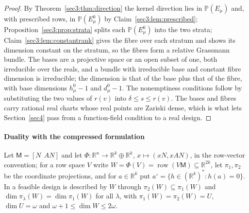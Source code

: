 \documentclass[journal]{IEEEtran}
\theoremstyle{plainn}
\theoremstyle{remark}
\newcommand{\row}{\operatorname{row}}
\begin{document}
\begin{proof}
By Theorem~\ref{sec3:thm:direction} the kernel direction lies in $\mathbb{P}(E_\mu)$ and, with
prescribed rows, in $\mathbb{P}(E_\mu^0)$ by Claim~\ref{sec3:lem:prescribed};
Proposition~\ref{sec3:prop:strata} splits each $\mathbb{P}(E_\mu^0)$ into the two strata;
Claim~\ref{sec3:lem:constantrank} gives the fibre over each stratum and shows its dimension constant on
the stratum, so the fibres form a relative Grassmann bundle. The bases are a projective space or an open
subset of one, both irreducible over the reals, and a bundle with irreducible base and constant fibre
dimension is irreducible; the dimension is that of the base plus that of the fibre, with base
dimensions $h_\mu^0-1$ and $d_\mu^0-1$. The nonemptiness conditions follow by substituting the two
values of $r(v)$ into $\delta\le s\le r(v)$. The bases and fibres carry rational real charts whose real
points are Zariski dense, which is what lets Section~\ref{sec4} pass from a function-field condition to
a real design.
\end{proof}


\paragraph*{Duality with the compressed formulation}\label{sec3:sub:duality}

Let $\mathsf{M}=[N\ \ AN]$ and let $\Phi\colon\mathbb{R}^n\to\mathbb{R}^{k}\oplus\mathbb{R}^{k}$,
$x\mapsto(xN,xAN)$, in the row-vector convention; for a row space $V$ write
$W=\Phi(V)=\row(V\mathsf{M})\subseteq\mathbb{R}^{2k}$, let $\pi_1,\pi_2$ be the coordinate projections,
and for $a\in\mathbb{R}^k$ put $a^\circ=\{h\in(\mathbb{R}^k)^*: h(a)=0\}$. In \cite{companion2} a
feasible design is described by $W$ through $\pi_2(W)\subseteq\pi_1(W)$ and
$\dim\pi_\lambda(W)=\dim\pi_1(W)$ for all $\lambda$, with $\pi_1(W)=\pi_2(W)=U$, $\dim U=\omega$ and
$\omega+1\le\dim W\le 2\omega$.
\end{document}
